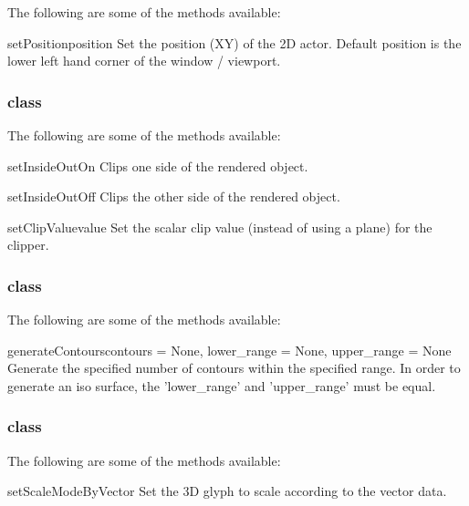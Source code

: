 The following are some of the methods available:

\begin{methoddesc}[Actor2D]{setPosition}{position}
Set the position (XY) of the 2D actor. Default position is the lower left hand
corner of the window / viewport.
\end{methoddesc}

\subsubsection{\Clipper class}

The following are some of the methods available:

\begin{methoddesc}[Clipper]{setInsideOutOn}{}
Clips one side of the rendered object.
\end{methoddesc}

\begin{methoddesc}[Clipper]{setInsideOutOff}{}
Clips the other side of the rendered object.
\end{methoddesc}

\begin{methoddesc}[Clipper]{setClipValue}{value}
Set the scalar clip value (instead of using a plane) for the clipper.
\end{methoddesc}

\subsubsection{\ContourModule class}

The following are some of the methods available:

\begin{methoddesc}[ContourModule]{generateContours}{contours = None, 
lower_range = None, upper_range = None}
Generate the specified number of contours within the specified range.
In order to generate an iso surface, the 'lower_range' and 'upper_range' 
must be equal.
\end{methoddesc}

\subsubsection{\GlyphThreeD class}

The following are some of the methods available:

\begin{methoddesc}[Glyph3D]{setScaleModeByVector}{}
Set the 3D glyph to scale according to the vector data.
\end{methoddesc}

